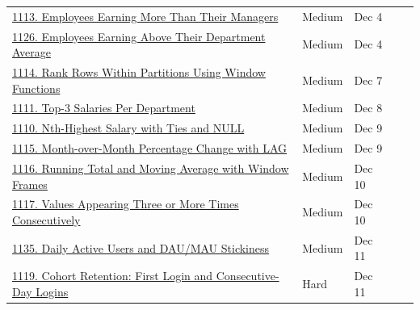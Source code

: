 \documentclass{article}
\begin{document}
\begin{longtable}{p{7.5cm} l l c c}
\href{https://www.deep-ml.com/problems/1113}{1113. Employees Earning More Than Their Managers} & Medium & Dec 4 & & \\
\href{https://www.deep-ml.com/problems/1126}{1126. Employees Earning Above Their Department Average} & Medium & Dec 4 & & \\
\href{https://www.deep-ml.com/problems/1114}{1114. Rank Rows Within Partitions Using Window Functions} & Medium & Dec 7 & & \\
\href{https://www.deep-ml.com/problems/1111}{1111. Top-3 Salaries Per Department} & Medium & Dec 8 & & \\
\href{https://www.deep-ml.com/problems/1110}{1110. Nth-Highest Salary with Ties and NULL} & Medium & Dec 9 & & \\
\href{https://www.deep-ml.com/problems/1115}{1115. Month-over-Month Percentage Change with LAG} & Medium & Dec 9 & & \\
\href{https://www.deep-ml.com/problems/1116}{1116. Running Total and Moving Average with Window Frames} & Medium & Dec 10 & & \\
\href{https://www.deep-ml.com/problems/1117}{1117. Values Appearing Three or More Times Consecutively} & Medium & Dec 10 & & \\
\href{https://www.deep-ml.com/problems/1135}{1135. Daily Active Users and DAU/MAU Stickiness} & Medium & Dec 11 & & \\
\href{https://www.deep-ml.com/problems/1119}{1119. Cohort Retention: First Login and Consecutive-Day Logins} & Hard & Dec 11 & & \\


\end{longtable}
\end{document}
